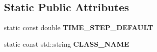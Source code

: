 \subsection*{Static Public Attributes}
\begin{DoxyCompactItemize}
\item 
static const double {\bfseries T\+I\+M\+E\+\_\+\+S\+T\+E\+P\+\_\+\+D\+E\+F\+A\+U\+LT}\hypertarget{classdynamicgraph_1_1sot_1_1ReactiveLQRController_acb1e94e6054ddcf31529ec6decd6331a}{}\label{classdynamicgraph_1_1sot_1_1ReactiveLQRController_acb1e94e6054ddcf31529ec6decd6331a}

\item 
static const std\+::string {\bfseries C\+L\+A\+S\+S\+\_\+\+N\+A\+ME}\hypertarget{classdynamicgraph_1_1sot_1_1ReactiveLQRController_a53faaaa218d7358f3285bd564253f55d}{}\label{classdynamicgraph_1_1sot_1_1ReactiveLQRController_a53faaaa218d7358f3285bd564253f55d}

\end{DoxyCompactItemize}
